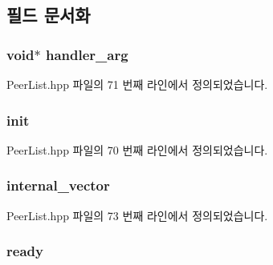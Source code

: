 \subsection{필드 문서화}
\subsubsection[{\texorpdfstring{handler\+\_\+arg}{handler_arg}}]{\setlength{\rightskip}{0pt plus 5cm}void$\ast$ handler\+\_\+arg\hspace{0.3cm}{\ttfamily [private]}}\hypertarget{class_peer_list_aee326623b9b841369cb4766c195f570a}{}\label{class_peer_list_aee326623b9b841369cb4766c195f570a}


Peer\+List.\+hpp 파일의 71 번째 라인에서 정의되었습니다.

\subsubsection[{\texorpdfstring{init}{init}}]{ init\hspace{0.3cm}{\ttfamily [private]}}\hypertarget{class_peer_list_a16f86d3255eb28f02dcaf5768e203b62}{}\label{class_peer_list_a16f86d3255eb28f02dcaf5768e203b62}


Peer\+List.\+hpp 파일의 70 번째 라인에서 정의되었습니다.

\subsubsection[{\texorpdfstring{internal\+\_\+vector}{internal_vector}}]{ internal\+\_\+vector\hspace{0.3cm}{\ttfamily [private]}}\hypertarget{class_peer_list_af3621b78fcd5c27e1653da3e543f9438}{}\label{class_peer_list_af3621b78fcd5c27e1653da3e543f9438}


Peer\+List.\+hpp 파일의 73 번째 라인에서 정의되었습니다.

\subsubsection[{\texorpdfstring{ready}{ready}}]{ ready\hspace{0.3cm}{\ttfamily [private]}}\hypertarget{class_peer_list_a65cf7d7f8e531611b245355ab91fd749}{}\label{class_peer_list_a65cf7d7f8e531611b245355ab91fd749}


